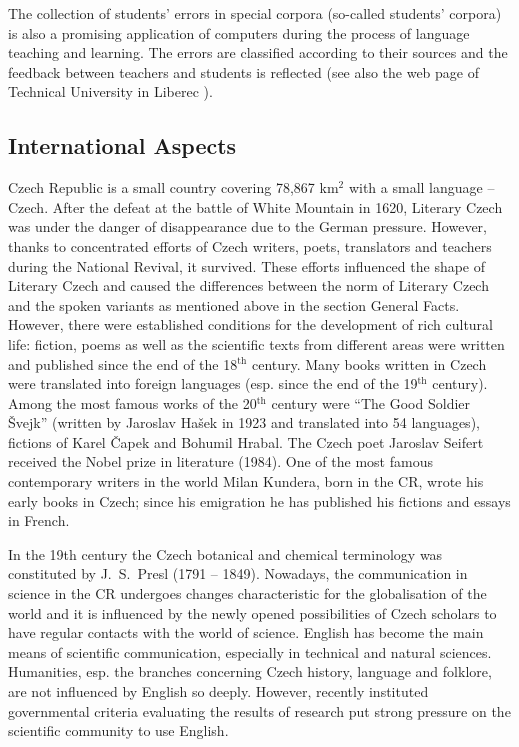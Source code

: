 \begin{multicols}{2}
The collection of students’ errors in special corpora (so-called students’ corpora) is also a promising application of computers during the process of language teaching and learning. The errors are classified according to their sources and the feedback between teachers and students is reflected (see also the web page of Technical University in Liberec \cite{Note10}).

\subsection{International Aspects}

Czech Republic is a small country covering 78,867 km$^{\textrm{2}}$ with a small language – Czech. After the defeat at the battle of White Mountain in 1620, Literary Czech was under the danger of disappearance due to the German pressure. However, thanks to concentrated efforts of Czech writers, poets, translators and teachers during the National Revival, it survived. These efforts influenced the shape of Literary Czech and caused the differences between the norm of Literary Czech and the spoken variants as mentioned above in the section General Facts. However, there were established conditions for the development of rich cultural life: fiction, poems as well as the scientific texts from different areas were written and published since the end of the 18$^{\textrm{th}}$ century. Many books written in Czech were translated into foreign languages (esp. since the end of the 19$^{\textrm{th}}$ century). Among the most famous works of the 20$^{\textrm{th}}$  century were “The Good Soldier Švejk” (written by Jaroslav Hašek in 1923 and translated into 54 languages), fictions of Karel Čapek and Bohumil Hrabal. The Czech poet Jaroslav Seifert received the Nobel prize in literature (1984). One of the most famous contemporary writers in the world Milan Kundera, born in the CR, wrote his early books in Czech; since his emigration he has published his fictions and essays in French.

In the 19th century the Czech botanical and chemical terminology was constituted by J.~S.~Presl (1791 – 1849). Nowadays, the communication in science in the CR undergoes changes characteristic for the globalisation of the world and it is influenced by the newly opened possibilities of Czech scholars to have regular contacts with the world of science. English has become the main means of scientific communication, especially in technical and natural sciences. Humanities, esp. the branches concerning Czech history, language  and folklore, are not influenced by English so deeply. However, recently instituted governmental criteria evaluating the results of research put strong pressure on the scientific community to use English.


\end{multicols}
